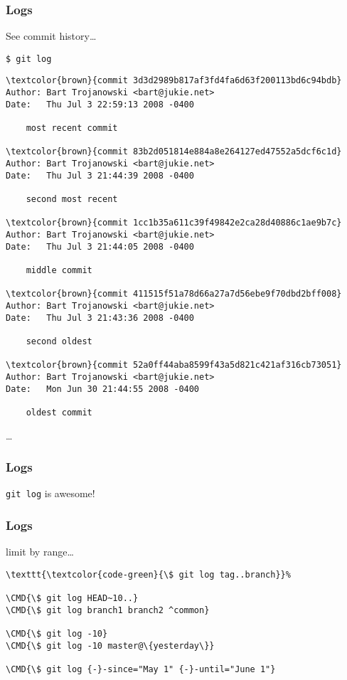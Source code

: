 \documentclass[english]{beamer}
\newcommand{\CMD}[1]{%
\texttt{\textcolor{code-green}{#1}}%
}
\begin{document}
\begin{frame}[fragile]
\frametitle{Logs}

See commit history\ldots
\vspace{\baselineskip}

\CMD{\$ git log}
{\tiny
\begin{Verbatim}[commandchars=\\\{\}]
\textcolor{brown}{commit 3d3d2989b817af3fd4fa6d63f200113bd6c94bdb}
Author: Bart Trojanowski <bart@jukie.net>
Date:   Thu Jul 3 22:59:13 2008 -0400

    most recent commit

\textcolor{brown}{commit 83b2d051814e884a8e264127ed47552a5dcf6c1d}
Author: Bart Trojanowski <bart@jukie.net>
Date:   Thu Jul 3 21:44:39 2008 -0400

    second most recent

\textcolor{brown}{commit 1cc1b35a611c39f49842e2ca28d40886c1ae9b7c}
Author: Bart Trojanowski <bart@jukie.net>
Date:   Thu Jul 3 21:44:05 2008 -0400

    middle commit

\textcolor{brown}{commit 411515f51a78d66a27a7d56ebe9f70dbd2bff008}
Author: Bart Trojanowski <bart@jukie.net>
Date:   Thu Jul 3 21:43:36 2008 -0400

    second oldest

\textcolor{brown}{commit 52a0ff44aba8599f43a5d821c421af316cb73051}
Author: Bart Trojanowski <bart@jukie.net>
Date:   Mon Jun 30 21:44:55 2008 -0400

    oldest commit

\end{Verbatim}
}
\ldots
\vspace{\textheight}
\end{frame}

\begin{frame}
\frametitle{Logs}

\begin{center}
        \CMD{git log} is awesome!
\end{center}
\end{frame}

\begin{frame}[fragile]
\frametitle{Logs}

limit by range\ldots
\vspace{\baselineskip}

\begin{Verbatim}[commandchars=\\\{\}]
\CMD{\$ git log tag..branch}
\CMD{\$ git log HEAD~10..}
\CMD{\$ git log branch1 branch2 ^common}

\CMD{\$ git log -10}
\CMD{\$ git log -10 master@\{yesterday\}}

\CMD{\$ git log {-}-since="May 1" {-}-until="June 1"}
\end{Verbatim}

\vspace{\textheight}
\end{frame}
\end{document}
